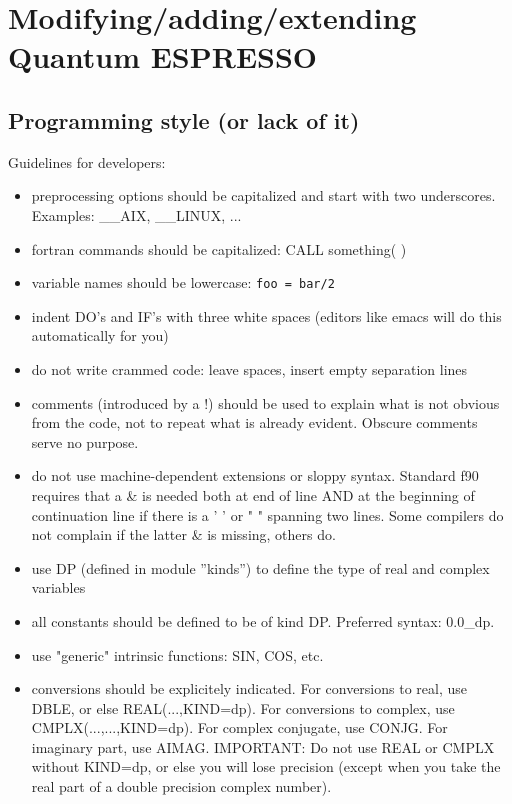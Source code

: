 \documentclass[12pt,a4paper]{article}
\def\qe{{\sc Quantum ESPRESSO}}
\begin{document}
\section{ Modifying/adding/extending \qe}

\subsection{Programming style (or lack of it)}

Guidelines for developers:
\begin{itemize}
\item preprocessing options should be capitalized and start with two underscores. Examples: \_\_AIX, \_\_LINUX, ...
\item fortran commands should be capitalized: 
CALL something( )
\item variable names should be lowercase: \texttt{foo = bar/2}
\item indent DO's and IF's with three white spaces (editors like emacs will do this automatically for you)
\item do not write crammed code: leave spaces, insert empty separation lines
\item comments (introduced by a !) should be used to explain what is not obvious from the code, not to repeat what is already evident. Obscure comments serve no purpose.
\item do not use machine-dependent extensions or sloppy syntax. Standard f90 requires that a \& is needed both at end of line AND at the beginning of continuation line if there is a ' ' or " " spanning two lines. Some compilers do not complain if the latter \& is missing, others do.
\item use DP (defined in module ''kinds'') to define the type of real and complex variables
\item all constants should be defined to be of kind DP.  Preferred syntax: 0.0\_dp.
\item use "generic" intrinsic functions: SIN, COS, etc.
\item conversions should be explicitely indicated. For conversions to real, 
use DBLE, or else REAL(...,KIND=dp). For conversions to complex, use 
CMPLX(...,...,KIND=dp). For complex conjugate, use CONJG.  For imaginary part, 
use AIMAG.  IMPORTANT: Do not use REAL or CMPLX without KIND=dp, or else you 
will lose precision (except when you take the real part of a 
double precision complex number).
\end{itemize}
\end{document}
